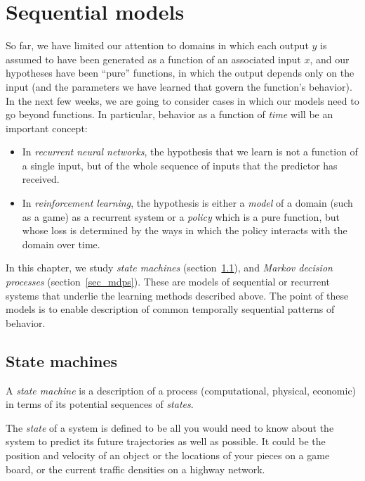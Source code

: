 \chapter{Sequential models}

So far, we have limited our attention to domains in which each output
$y$ is assumed to have been generated as a function of an associated
input $x$, and our hypotheses have been ``pure'' functions, in which
the output depends only on the input (and the parameters we have
learned that govern the function's behavior).  In the next few weeks,
we are going to consider cases in which our models need to go beyond
functions.  In particular, behavior as a function of {\em time} will
be an important concept:
\begin{itemize}
\item In {\em recurrent neural networks}, the hypothesis that we learn
  is not a function of a single input, but of the whole sequence of
  inputs that the predictor has received.
\item In {\em reinforcement learning}, the hypothesis is either a
  {\em model} of a domain (such as a game) as a recurrent system or a
  {\em policy} which is a pure function, but whose loss is determined
  by the ways in which the policy interacts with the domain over time.
\end{itemize}

In this chapter, we study {\em state machines}
(section~\ref{sec:state_machines}), and {\em Markov decision
  processes} (section~\ref{sec_mdps}).  These are models of sequential
or recurrent systems that underlie the learning methods described
above.  The point of these models is to enable description of common
temporally sequential patterns of behavior.

\section{State machines}
\label{sec:state_machines}

A {\em state machine}
is a description of a process  (computational, physical, economic) in terms
of its potential sequences of {\em states}.

The {\em state} of a system is defined to be all you would need to
know about the system to predict its future trajectories as well as
possible.  It could be the position and  velocity of an object or the
locations of your pieces on a game board,  or the current traffic
densities on a highway network.

